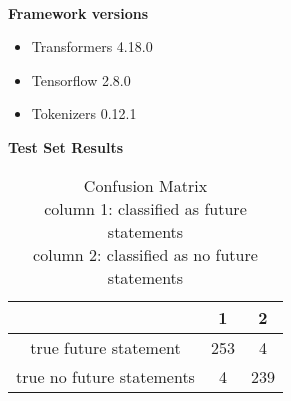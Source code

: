 \documentclass[11pt]{article}
\begin{document}
\begin{table}[ht]
\setlength\tabcolsep{2pt} %
\footnotesize\centering
\captionsetup{size=footnotesize}
\resizebox{\columnwidth}{!}{%
\begin{tabular}{
    ccccc}

\hline

\textbf{Epoch} & \textbf{Train Loss} & \textbf{Train Accuracy} & \textbf{Val. Loss} & \textbf{Val. Accuracy}\\
\hline
0 & 0.3816 & 0.8594 & 0.1547 & 0.9475 \\
1 & 0.1142 & 0.9613 & 0.1272 & 0.9625 \\
\hline
\end{tabular}}
\caption{\label{future-model-train}
Training Results
}
\end{table}
%
%
\\
\textbf{Framework versions}
\begin{itemize}
    \item Transformers 4.18.0
    \item Tensorflow 2.8.0
    \item Tokenizers 0.12.1
\end{itemize}%
\textbf{Test Set Results}
\begin{table}
\small
\captionsetup{size=footnotesize}
\begin{tabular}{
    c|cc}
\hline
& 1 & 2\\
\hline
true future statement & 253 & 4 \\
true no future statements & 4 & 239 \\
\hline
\end{tabular}
\caption{\label{cm}
Confusion Matrix\\
column 1: classified as future statements\\
column 2: classified as no future statements
}
\end{table}
\end{document}
